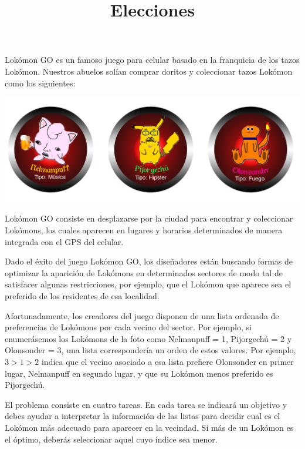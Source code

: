 \documentclass{oci}
\title{Elecciones}
\begin{document}
\begin{problemDescription}
Lok\'omon GO es un famoso juego para celular basado en la franquicia de los tazos Lok\'omon. Nuestros abuelos sol\'ian comprar doritos y coleccionar tazos Lok\'omon como los siguientes:

\begin{center}
	\includegraphics[scale=0.4]{lokomons.jpg}
\end{center}

Lok\'omon GO consiste en desplazarse por la ciudad para encontrar y coleccionar Lok\'omons, los cuales aparecen en lugares y horarios determinados de manera integrada con el GPS del celular.

Dado el \'exito del juego Lok\'omon GO, los dise\~nadores est\'an buscando formas de optimizar la aparici\'on de Lok\'omons en determinados sectores de modo tal de satisfacer algunas restricciones, por ejemplo, que el Lok\'omon que aparece sea el preferido de los residentes de esa localidad.

Afortunadamente, los creadores del juego disponen de una lista ordenada de preferencias de Lok\'omons por cada vecino del sector. Por ejemplo, si enumer\'asemos los Lok\'omons de la foto como Nelmanpuff = 1, Pijorgech\'u = 2 y Olonsonder = 3, una lista corresponder\'ia un orden de estos valores. Por ejemplo, $3 > 1 > 2$ indica que el vecino asociado a esa lista prefiere Olonsonder en primer lugar, Nelmanpuff en segundo lugar, y que su Lok\'omon menos preferido es Pijorgech\'u.

El problema consiste en cuatro tareas. En cada tarea se indicar\'a un objetivo y debes ayudar a interpretar la informaci\'on de las listas para decidir cual es el Lok\'omon m\'as adecuado para aparecer en la vecindad. Si m\'as de un Lok\'omon es el \'optimo, deber\'as seleccionar aquel cuyo \'indice sea menor.
\end{problemDescription}
\end{document}
